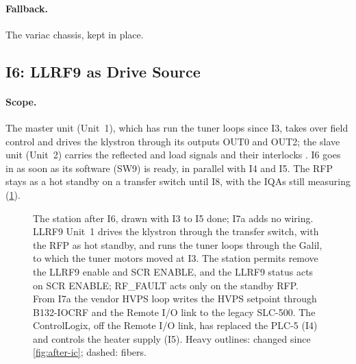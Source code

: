 \paragraph{Fallback.} The variac chassis, kept in place.

\subsection{I6: LLRF9 as Drive Source}\label{sec:i-drive}

\paragraph{Scope.} The master unit (Unit~1), which has run the tuner loops since I3,
takes over field control and drives the klystron through its outputs OUT0 and OUT2;
the slave unit (Unit~2) carries the reflected and load signals and their interlocks
. I6 goes in as soon as its software (SW9) is ready, in parallel with I4 and I5.
The RFP stays as a hot standby on a transfer switch until I8, with the IQAs still
measuring (\cref{fig:after-drive}).

\begin{figure}[tbp]
\centering
\begin{fitpicture}

\end{fitpicture}
\caption[The station after I6 and I7a.]{The station after I6, drawn with I3 to I5
done; I7a adds no wiring. LLRF9 Unit~1 drives the klystron through the transfer
switch, with the RFP as hot standby, and runs the tuner loops through the Galil, to
which the tuner motors moved at I3. The station permits remove the LLRF9 enable and
SCR ENABLE, and the LLRF9 status acts on SCR ENABLE; RF\_FAULT acts only on the
standby RFP. From I7a the vendor HVPS loop writes the HVPS setpoint through
\mbox{B132-IOCRF} and the Remote I/O link to the legacy SLC-500. The ControlLogix,
off the Remote I/O link, has replaced the PLC-5 (I4) and controls the heater supply
(I5). Heavy outlines: changed since \cref{fig:after-ic}; dashed: fibers.}\label{fig:after-drive}
\end{figure}

